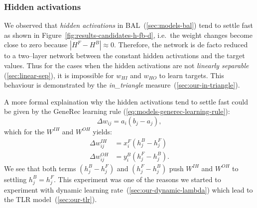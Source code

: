 
\subsubsection{Hidden activations}
\label{sec:our-hidden-activation} 

We observed that \emph{hidden activations} in BAL~(\ref{sec:models-bal}) tend to settle fast as shown in Figure~\ref{fig:results-candidates-h-fb-d}, i.e.~the weight changes become close to zero because $|H^F - H^B| \approx 0$. Therefore, the network is de facto reduced to a two--layer network between the constant hidden activations and the target values. Thus for the cases when the hidden activations are not \emph{linearly separable} (\ref{sec:linear-sep}), it is impossible for $w_{HI}$ and $w_{HO}$ to learn targets. This behaviour is demonstrated by the \emph{in\_triangle} measure~(\ref{sec:our-in-triangle}). 

A more formal explaination why the hidden activations tend to settle fast could be given by the GeneRec learning rule (\ref{eq:models-generec-learning-rule}): 
\begin{equation} 
  \Delta w_{ij} = a_i(b_j - a_j),
\end{equation} \nonumber 
which for the $W^{IH}$ and $W^{OH}$ yields: 
\begin{align} 
  \Delta w_{ij}^{IH} &= x^F_i(h^B_j - h^F_j) \nonumber \\ 
  \Delta w_{ij}^{OH} &= y^B_i(h^F_j - h^B_j). \nonumber  
\end{align} 
We see that both terms $(h^B_j - h^F_j)$ and $(h^F_j - h^B_j)$ push $W^{IH}$ and $W^{OH}$ to settling $h^B_j = h^F_j$. This experiment was one of the reasons we started to experiment with dynamic learning rate~(\ref{sec:our-dynamic-lambda}) which lead to the TLR model~(\ref{sec:our-tlr}). 

